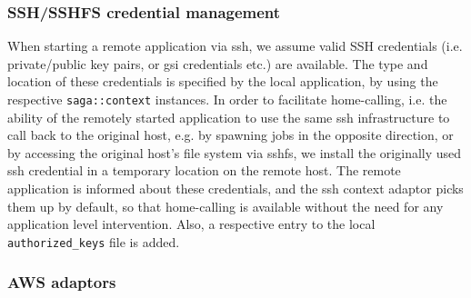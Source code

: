 \documentclass[conference,final]{IEEEtran}
\newcommand{\upp}{\vspace*{-0.6em}}
\newcommand{\T}[1]{\texttt{#1}}
\newcommand{\sshfs}[1]{\texttt{sshfs}}
\begin{document}
\subsubsection{SSH/SSHFS credential management}
When starting a remote application via ssh, we assume valid SSH
credentials (i.e. private/public key pairs, or gsi credentials etc.)
are available.  The type and location of these credentials is
specified by the local application, by using the respective
\T{saga::context} instances.  In order to facilitate home-calling,
i.e. the ability of the remotely started application to use the same
ssh infrastructure to call back to the original host, e.g. by spawning
jobs in the opposite direction, or by accessing the original host's
file system via sshfs, we install the originally used ssh credential
in a temporary location on the remote host. The remote application is
informed about these credentials, and the ssh context adaptor picks
them up by default, so that home-calling is available without the need
for any application level intervention.  Also, a respective entry to
the local \T{authorized\_keys} file is added. %





\upp
\subsubsection{AWS adaptors}
\end{document}
